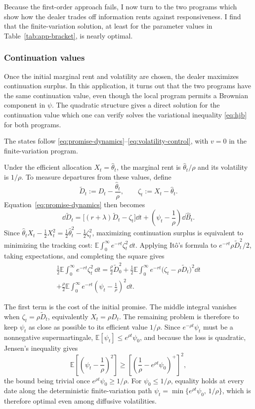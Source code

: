 \documentclass[12pt]{article}
\newcommand{\E}{\mathbb{E}}
\newcommand{\hth}{\hat\theta}
\newcommand{\hB}{\hat B}
\begin{document}
Because the first-order approach fails, I now turn to the two programs which show how the dealer trades off information rents against responsiveness. I find that the finite-variation solution, at least for the parameter values in
Table~\ref{tab:app-bracket}, is nearly
optimal.

\subsubsection{Continuation values}
\label{sub:app-continuation}

Once the initial marginal rent and volatility are chosen, the dealer
maximizes continuation surplus. In this application, it turns out that the two
programs have the same continuation value, even though the local
program permits a Brownian component in \(\psi\). The quadratic
structure gives a direct solution for the continuation value
which one can verify solves the variational inequality \eqref{eq:hjb} for both programs.

The states follow \eqref{eq:promise-dynamics}--\eqref{eq:volatility-control},
with \(v=0\) in the finite-variation program.

Under the efficient allocation \(X_t=\hth_t\), the marginal rent is
\(\hth_t/\rho\) and its volatility is \(1/\rho\). To measure departures
from these values, define
\[
  \widetilde D_t
  :=
  D_t-\frac{\hth_t}{\rho},
  \qquad
  \zeta_t
  :=
  X_t-\hth_t.
\]
Equation~\eqref{eq:promise-dynamics} then becomes
\[
  \dd\widetilde D_t
  =
  \bigl[(r+\lambda)\widetilde D_t-\zeta_t\bigr]\dd t
  +
  \left(\psi_t-\frac1\rho\right)\dd\hB_t.
\]
Since
\(\hth_tX_t-\frac12X_t^2=\frac12\hth_t^2-\frac12\zeta_t^2\),
maximizing continuation surplus is equivalent to minimizing the
tracking cost: $\E\int_0^\infty e^{-rt}\zeta_t^2\,\dd t$. Applying It\^o's formula to
\(e^{-rt}\rho\widetilde D_t^2/2\), taking expectations, and completing
the square gives
\begin{multline}\label{eq:app-tracking-identity}
  \frac12\E\int_0^\infty e^{-rt}\zeta_t^2\,\dd t
  ={}
  \frac{\rho}{2}\widetilde D_0^2
  +\frac12\E\int_0^\infty e^{-rt}
    \bigl(\zeta_t-\rho\widetilde D_t\bigr)^2\dd t\\
  +\frac{\rho}{2}\E\int_0^\infty e^{-rt}
    \left(\psi_t-\frac1\rho\right)^2\dd t.
\end{multline}

The first term is the cost of the initial promise. The
middle integral vanishes when \(\zeta_t=\rho\widetilde D_t\),
equivalently \(X_t=\rho D_t\). The remaining problem is therefore to
keep \(\psi_t\) as close as possible to its efficient value \(1/\rho\).
Since \(e^{-\rho t}\psi_t\) must be a nonnegative supermartingale,
\(\E[\psi_t]\leq e^{\rho t}\psi_0\), and because the loss is quadratic,
Jensen's inequality gives
\[
  \E\left[
    \left(\psi_t-\frac1\rho\right)^2
  \right]
  \geq
  \left[
    \left(\frac1\rho-e^{\rho t}\psi_0\right)^+
  \right]^2,
\]
the bound being trivial once \(e^{\rho t}\psi_0\geq1/\rho\). For
\(\psi_0\leq1/\rho\), equality holds at every date along the
deterministic finite-variation path
\(\psi_t=\min\{e^{\rho t}\psi_0,\,1/\rho\}\), which is therefore
optimal even among diffusive volatilities.
\end{document}
